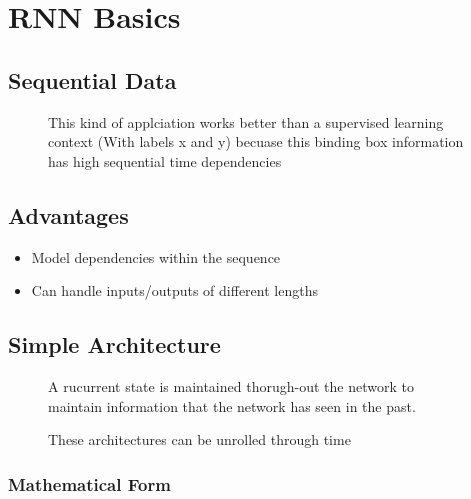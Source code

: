 \documentclass[11pt]{article}
\begin{document}


\tableofcontents

\clearpage

\section{RNN Basics}

\subsection{Sequential Data}

\begin{figure}[H]
    \centering
    \caption*{This kind of applciation works better than a supervised learning context (With labels x and y) becuase this binding box information has high sequential time dependencies}
\end{figure}

\subsection{Advantages}

\begin{itemize}
    \item Model dependencies within the sequence
    \item Can handle inputs/outputs of different lengths
\end{itemize}

\subsection{Simple Architecture}

\begin{figure}[H]
    \centering
    \caption*{A rucurrent state is maintained thorugh-out the network to maintain information that the network has seen in the past.}
\end{figure}

\begin{figure}[H]
    \centering
    \caption*{These architectures can be unrolled through time}
\end{figure}

\subsubsection{Mathematical Form}
\end{document}
